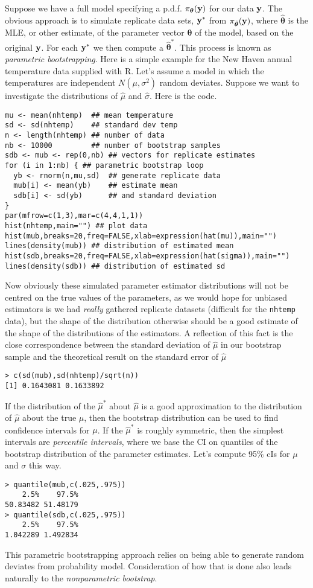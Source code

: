 \documentclass[10pt] {article}
\newcommand{\eps}[3]
{{\begin{center}
 \rotatebox{#1}{\scalebox{#2}{\texttt{[image: \#3]}}}
 \end{center}}
}
\theoremstyle{definition}
\begin{document}
Suppose we have a full model specifying a p.d.f. $\pi_{\bm \theta}({\bf y})$ for our data $\bf y$. The obvious approach is to simulate replicate data sets, ${\bf y}^*$ from $\pi_{\hat {\bm \theta}}({\bf y})$, where $\hat {\bm \theta}$ is the MLE, or other estimate, of the parameter vector $\bm \theta$ of the model, based on the original $\bf y$. For each ${\bf y}^*$ we then compute a $\hat {\bm \theta}^*$. This process is known as {\em parametric bootstrapping}. Here is a simple example for the New Haven annual temperature data supplied with R. Let's assume a model in which the temperatures are independent $N(\mu,\sigma^2)$ random deviates. Suppose we want to investigate the distributions of $\hat \mu$ and $\hat \sigma$. Here is the code.
\begin{lstlisting}
mu <- mean(nhtemp)  ## mean temperature
sd <- sd(nhtemp)    ## standard dev temp
n <- length(nhtemp) ## number of data 
nb <- 10000         ## number of bootstrap samples
sdb <- mub <- rep(0,nb) ## vectors for replicate estimates
for (i in 1:nb) { ## parametric bootstrap loop
  yb <- rnorm(n,mu,sd)  ## generate replicate data
  mub[i] <- mean(yb)    ## estimate mean
  sdb[i] <- sd(yb)      ## and standard deviation
}
par(mfrow=c(1,3),mar=c(4,4,1,1))
hist(nhtemp,main="") ## plot data
hist(mub,breaks=20,freq=FALSE,xlab=expression(hat(mu)),main="")
lines(density(mub)) ## distribution of estimated mean
hist(sdb,breaks=20,freq=FALSE,xlab=expression(hat(sigma)),main="")
lines(density(sdb)) ## distribution of estimated sd
\end{lstlisting}
\eps{-90}{.7}{nht-para-bs.eps} 
Now obviously these simulated parameter estimator distributions will not be centred on the true values of the parameters, as we would hope for unbiased estimators is we had {\em really} gathered replicate datasets (difficult for the {\tt nhtemp } data), but the shape of the distribution otherwise should be a good estimate of the shape of the distributions of the estimators. A reflection of this fact is the close correspondence between the standard deviation of $\hat \mu$ in our bootstrap sample and the theoretical result on the standard error of $\hat \mu$ 
\begin{lstlisting}
> c(sd(mub),sd(nhtemp)/sqrt(n))
[1] 0.1643081 0.1633892
\end{lstlisting}
If the distribution of the $\hat \mu^*$ about $\hat \mu$ is a good approximation to the distribution of $\hat \mu$ about the true $\mu$, then the bootstrap distribution can be used to find confidence intervals for $\mu$. If the $\hat \mu^*$ is roughly symmetric, then the simplest intervals are {\em percentile intervals}, where we base the CI on quantiles of the bootstrap distribution of the parameter estimates. Let's compute 95\% cIs for $\mu $ and $\sigma$ this way.
\begin{lstlisting}
> quantile(mub,c(.025,.975))
    2.5%    97.5% 
50.83482 51.48179 
> quantile(sdb,c(.025,.975))
    2.5%    97.5% 
1.042289 1.492834 
\end{lstlisting}
This parametric bootstrapping approach relies on being able to generate random deviates from probability model. Consideration of how that is done also leads naturally to the  {\em nonparametric bootstrap}.
\end{document}
